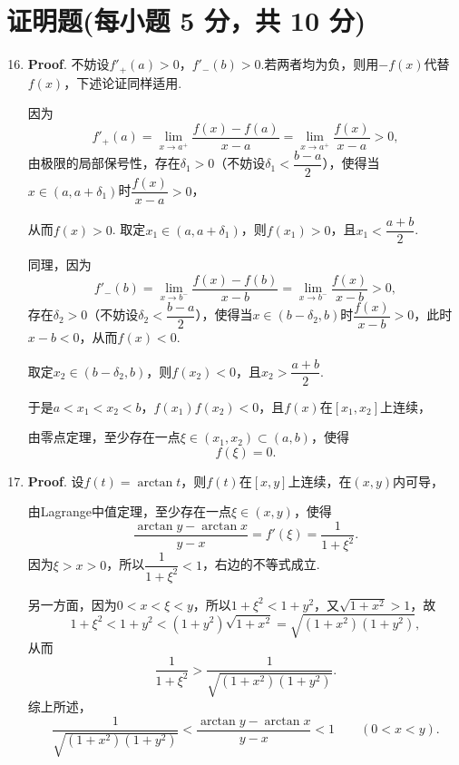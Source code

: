 \documentclass[../main.tex]{subfiles}
\begin{document}
\section{证明题(每小题 5 分，共 10 分)}
\begin{enumerate}
    \setcounter{enumi}{15}
    \item \textbf{Proof}. 不妨设$f'_{+}(a)>0$，$f'_{-}(b)>0$.若两者均为负，则用$-f(x)$代替$f(x)$，下述论证同样适用.

          因为
          \[
              f'_{+}(a)=\lim_{x\to a^{+}}\frac{f(x)-f(a)}{x-a}=\lim_{x\to a^{+}}\frac{f(x)}{x-a}>0,
          \]
          由极限的局部保号性，存在$\delta_{1}>0$（不妨设$\delta_{1}<\dfrac{b-a}{2}$），使得当$x\in\left(a,a+\delta_{1}\right)$时$\dfrac{f(x)}{x-a}>0$，

          从而$f(x)>0$. 取定$x_{1}\in\left(a,a+\delta_{1}\right)$，则$f(x_{1})>0$，且$x_{1}<\dfrac{a+b}{2}$.

          同理，因为
          \[
              f'_{-}(b)=\lim_{x\to b^{-}}\frac{f(x)-f(b)}{x-b}=\lim_{x\to b^{-}}\frac{f(x)}{x-b}>0,
          \]
          存在$\delta_{2}>0$（不妨设$\delta_{2}<\dfrac{b-a}{2}$），使得当$x\in\left(b-\delta_{2},b\right)$时$\dfrac{f(x)}{x-b}>0$，此时$x-b<0$，从而$f(x)<0$.

          取定$x_{2}\in\left(b-\delta_{2},b\right)$，则$f(x_{2})<0$，且$x_{2}>\dfrac{a+b}{2}$.

          于是$a<x_{1}<x_{2}<b$，$f(x_{1})f(x_{2})<0$，且$f(x)$在$\left[x_{1},x_{2}\right]$上连续，

          由零点定理，至少存在一点$\xi\in\left(x_{1},x_{2}\right)\subset(a,b)$，使得
          \[
              f(\xi)=0.
          \]

    \item \textbf{Proof}. 设$f(t)=\arctan t$，则$f(t)$在$[x,y]$上连续，在$(x,y)$内可导，

          由Lagrange中值定理，至少存在一点$\xi\in(x,y)$，使得
          \[
              \frac{\arctan y-\arctan x}{y-x}=f'(\xi)=\frac{1}{1+\xi^{2}}.
          \]
          因为$\xi>x>0$，所以$\dfrac{1}{1+\xi^{2}}<1$，右边的不等式成立.

          另一方面，因为$0<x<\xi<y$，所以$1+\xi^{2}<1+y^{2}$，又$\sqrt{1+x^{2}}>1$，故
          \[
              1+\xi^{2}<1+y^{2}<\left(1+y^{2}\right)\sqrt{1+x^{2}}=\sqrt{\left(1+x^{2}\right)\left(1+y^{2}\right)},
          \]
          从而
          \[
              \frac{1}{1+\xi^{2}}>\frac{1}{\sqrt{\left(1+x^{2}\right)\left(1+y^{2}\right)}}.
          \]
          综上所述，
          \[
              \frac{1}{\sqrt{\left(1+x^{2}\right)\left(1+y^{2}\right)}}<\frac{\arctan y-\arctan x}{y-x}<1\qquad(0<x<y).
          \]
\end{enumerate}
\end{document}
